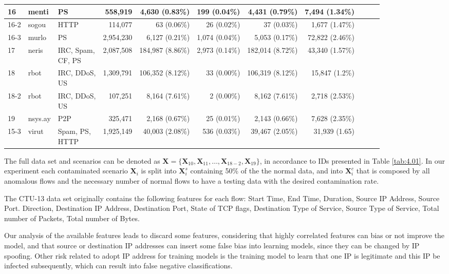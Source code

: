 \begin{table}[h!]
\begin{tabular}{| l | l | l | r | r | r | r | r | r | r | r | }
			16 & menti &PS & 558,919 & 4,630 (0.83\%) & 199 (0.04\%) & 4,431 (0.79\%) &7,494 (1.34\%)\\ \hline
			16-2 & sogou &HTTP & 114,077 & 63 (0.06\%) & 26 (0.02\%) & 37 (0.03\%) &1,677 (1.47\%)\\ \hline
			16-3 & murlo &PS & 2,954,230 & 6,127 (0.21\%) & 1,074 (0.04\%) & 5,053 (0.17\%) &72,822 (2.46\%)\\ \hline
			17 & neris &\makecell[l]{IRC, Spam,\\CF, PS} & 2,087,508 & 184,987 (8.86\%) & 2,973 (0.14\%) & 182,014 (8.72\%) &43,340 (1.57\%)\\ \hline
			18 & rbot &\makecell[l]{IRC, DDoS,\\US} & 1,309,791 & 106,352 (8.12\%) & 33 (0.00\%) & 106,319 (8.12\%) &15,847 (1.2\%)\\ \hline
			18-2 & rbot &\makecell[l]{IRC, DDoS,\\US} & 107,251 & 8,164 (7.61\%) & 2 (0.00\%) & 8,162 (7.61\%) &2,718 (2.53\%)\\ \hline
			19 & nsys.ay &P2P & 325,471 & 2,168 (0.67\%) & 25 (0.01\%) & 2,143 (0.66\%) &7,628 (2.35\%)\\ \hline
			15-3 & virut &\makecell[l]{Spam, PS,\\HTTP} & 1,925,149 & 40,003 (2.08\%) & 536 (0.03\%) & 39,467 (2.05\%) &31,939 (1.65)\\ \hline
	\end{tabular}
\end{table}

The full data set and scenarios can be denoted as $\pmb{X} = \{\pmb{X}_{10}, \pmb{X}_{11}, \ldots , \pmb{X}_{18-2}, \pmb{X}_{19}\}$, in accordance to IDs presented in Table \ref{tab:4.01}. In our experiment each contaminated scenario $\pmb{X}_i$ is split into $\pmb{X}_i^s$ containing 50\% of the the normal data, and into $\pmb{X}_i^c$ that is composed by all anomalous flows and the necessary number of normal flows to have a testing data with the desired contamination rate.

The CTU-13 data set originally contains the following features for each flow: Start Time, End Time, Duration, Source IP Address, Source Port. Direction, Destination IP Address, Destination Port, State of TCP flags, Destination Type of Service, Source Type of Service, Total number of Packets, Total number of Bytes.

Our analysis of the available features leads to discard some features, considering that highly correlated features can bias or not improve the model, and that source or destination IP addresses can insert some false bias into learning models, since they can be changed by IP spoofing. Other risk related to adopt IP address for training models is the training model to learn that
one IP is legitimate and this IP be infected subsequently, which can result into false negative classifications.

